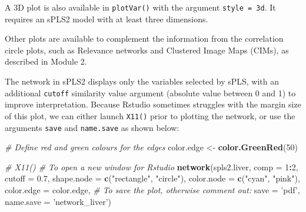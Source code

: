 \documentclass[]{book}
\newenvironment{Shaded}{\begin{snugshade}}{\end{snugshade}}
\newcommand{\KeywordTok}[1]{\textcolor[rgb]{0.13,0.29,0.53}{\textbf{#1}}}
\newcommand{\DataTypeTok}[1]{\textcolor[rgb]{0.13,0.29,0.53}{#1}}
\newcommand{\DecValTok}[1]{\textcolor[rgb]{0.00,0.00,0.81}{#1}}
\newcommand{\FloatTok}[1]{\textcolor[rgb]{0.00,0.00,0.81}{#1}}
\newcommand{\StringTok}[1]{\textcolor[rgb]{0.31,0.60,0.02}{#1}}
\newcommand{\CommentTok}[1]{\textcolor[rgb]{0.56,0.35,0.01}{\textit{#1}}}
\newcommand{\OperatorTok}[1]{\textcolor[rgb]{0.81,0.36,0.00}{\textbf{#1}}}
\newcommand{\NormalTok}[1]{#1}
\begin{document}
A 3D plot is also available in \texttt{plotVar()} with the argument
\texttt{style\ =\ \textquotesingle{}3d\textquotesingle{}}. It requires
an sPLS2 model with at least three dimensions.

Other plots are available to complement the information from the
correlation circle plots, such as Relevance networks and Clustered Image
Maps (CIMs), as described in Module 2.

The network in sPLS2 displays only the variables selected by sPLS, with
an additional \texttt{cutoff} similarity value argument (absolute value
between 0 and 1) to improve interpretation. Because Rstudio sometimes
struggles with the margin size of this plot, we can either launch
\texttt{X11()} prior to plotting the network, or use the arguments
\texttt{save} and \texttt{name.save} as shown below:

\begin{Shaded}
\begin{Highlighting}[]
\CommentTok{# Define red and green colours for the edges}
\NormalTok{color.edge <-}\StringTok{ }\KeywordTok{color.GreenRed}\NormalTok{(}\DecValTok{50}\NormalTok{)}

\CommentTok{# X11()  # To open a new window for Rstudio}
\KeywordTok{network}\NormalTok{(spls2.liver, }\DataTypeTok{comp =} \DecValTok{1}\OperatorTok{:}\DecValTok{2}\NormalTok{,}
        \DataTypeTok{cutoff =} \FloatTok{0.7}\NormalTok{,}
        \DataTypeTok{shape.node =} \KeywordTok{c}\NormalTok{(}\StringTok{"rectangle"}\NormalTok{, }\StringTok{"circle"}\NormalTok{),}
        \DataTypeTok{color.node =} \KeywordTok{c}\NormalTok{(}\StringTok{"cyan"}\NormalTok{, }\StringTok{"pink"}\NormalTok{),}
        \DataTypeTok{color.edge =}\NormalTok{ color.edge,}
        \CommentTok{# To save the plot, otherwise comment out:}
        \DataTypeTok{save =} \StringTok{'pdf'}\NormalTok{, }\DataTypeTok{name.save =} \StringTok{'network_liver'}\NormalTok{)}
\end{Highlighting}
\end{Shaded}
\end{document}
